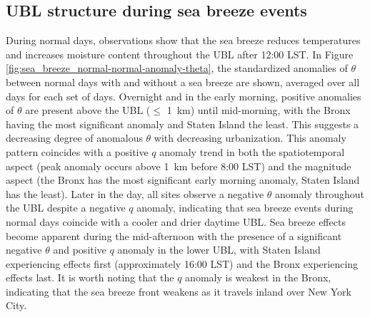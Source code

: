 \documentclass[num-refs]{wiley-article}
\begin{document}
\subsection{UBL structure during sea breeze events}
During normal days, observations show that the sea breeze reduces temperatures and increases moisture content throughout the UBL after 12:00 LST. In Figure \ref{fig:sea_breeze_normal-normal-anomaly-theta}, the standardized anomalies of $\theta$ between normal days with and without a sea breeze are shown, averaged over all days for each set of days. Overnight and in the early morning, positive anomalies of $\theta$ are present above the UBL ($\leq$ \SI{1}{\kilo\meter}) until mid-morning, with the Bronx having the most significant anomaly and Staten Island the least. This suggests a decreasing degree of anomalous $\theta$ with decreasing urbanization. This anomaly pattern coincides with a positive $q$ anomaly trend in both the spatiotemporal aspect (peak anomaly occurs above \SI{1}{\kilo\meter} before 8:00 LST) and the magnitude aspect (the Bronx has the most significant early morning anomaly, Staten Island has the least). Later in the day, all sites observe a negative $\theta$ anomaly throughout the UBL despite a negative $q$ anomaly, indicating that sea breeze events during normal days coincide with a cooler and drier daytime UBL. Sea breeze effects become apparent during the mid-afternoon with the presence of a significant negative $\theta$ and positive $q$ anomaly in the lower UBL, with Staten Island experiencing effects first (approximately 16:00 LST) and the Bronx experiencing effects last. It is worth noting that the $q$ anomaly is weakest in the Bronx, indicating that the sea breeze front weakens as it travels inland over New York City.
\\ \\
\end{document}
